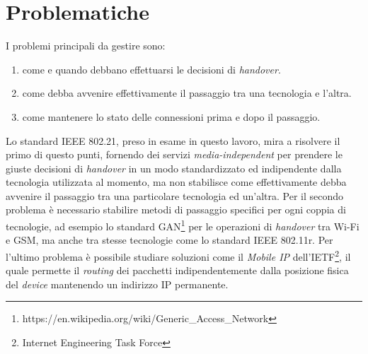\section{Problematiche}
I problemi principali da gestire sono:
\begin{enumerate}
\item come e quando debbano effettuarsi le decisioni di {\em handover}.
\item come debba avvenire effettivamente il passaggio tra una tecnologia e l'altra.
\item come mantenere lo stato delle connessioni prima e dopo il passaggio.
\end{enumerate}
Lo standard IEEE 802.21, preso in esame in questo lavoro, mira a risolvere il primo di questo punti, fornendo dei servizi {\em media-independent} per prendere le giuste decisioni di {\em handover} in un modo standardizzato ed indipendente dalla tecnologia utilizzata al momento, ma non stabilisce come effettivamente debba avvenire il passaggio tra una particolare tecnologia ed un'altra.
Per il secondo problema è necessario stabilire metodi di passaggio specifici per ogni coppia di tecnologie, ad esempio lo standard GAN\footnote{https://en.wikipedia.org/wiki/Generic\_Access\_Network} per le operazioni di {\em handover} tra Wi-Fi e GSM, ma anche tra stesse tecnologie come lo standard IEEE 802.11r.
Per l'ultimo problema è possibile studiare soluzioni come il {\em Mobile IP}\cite{mobileip} dell'IETF\footnote{Internet Engineering Task Force}, il quale permette il {\em routing} dei pacchetti indipendentemente dalla posizione fisica del {\em device} mantenendo un indirizzo IP permanente.
